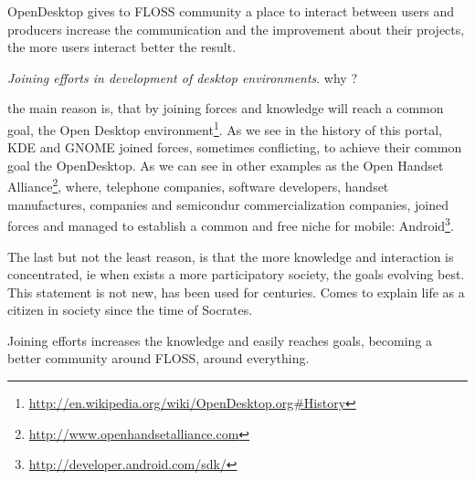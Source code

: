\documentclass[11pt]{scrartcl}
\begin{document}
\par OpenDesktop gives to FLOSS community a place to interact between users and producers increase the communication and the improvement about their projects, the more users interact better the result.

\par \emph{Joining efforts in development of desktop environments}. why ?

\par the main reason is, that by joining forces and knowledge will reach a common goal, the Open Desktop environment\footnote{\url{http://en.wikipedia.org/wiki/OpenDesktop.org\#History}}. As we see in the history of this portal, KDE and GNOME joined forces, sometimes conflicting, to achieve their common goal the OpenDesktop. As we can see in other examples as the Open Handset Alliance\footnote{\url{http://www.openhandsetalliance.com}}, where, telephone companies, software developers, handset manufactures, companies and semicondur commercialization companies, joined forces and managed to establish a common and free niche for mobile: Android\footnote{\url{http://developer.android.com/sdk/}}.

\par The last but not the least reason, is that the more knowledge and interaction is concentrated, ie when exists a more participatory society, the goals evolving best. This statement is not new, has been used for centuries. Comes to explain life as a citizen in society since the time of Socrates.

\par Joining efforts increases the knowledge and easily reaches goals, becoming a better community around FLOSS, around everything.
\end{document}
